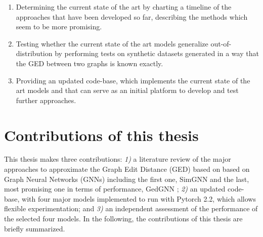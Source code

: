 \documentclass[../Thesis.tex]{subfiles}
\begin{document}
  \begin{enumerate}
      \item Determining the current state of the art by charting a timeline of the approaches that have been developed so far, describing the methods which seem to be more promising.
      \item Testing whether the current state of the art models generalize out-of-distribution by performing tests on synthetic datasets generated in a way that the GED between two graphs is known exactly.
      \item Providing an updated code-base, which implements the current state of the art models and that can serve as an initial platform to develop and test further approaches.
  \end{enumerate}


 \section{Contributions of this thesis}

	This thesis makes three contributions: \emph{1)} a literature review of the major approaches to approximate the Graph Edit Distance (GED) based on based on Graph Neural Networks (GNNs) including the first one, SimGNN \cite{simgnn__a_neural_network_approach_to_fast_graph_similarity_computation} and the last, most promising one in terms of performance, GedGNN \cite{computing_graph_edit_distance_via_neural_graph_matching}; \emph{2)} an updated code-base, with four major models implemented to run with Pytorch 2.2, which allows flexible experimentation; and \emph{3)} an independent assessment of the performance of the selected four models. In the following, the contributions of this thesis are briefly summarized.
\end{document}
